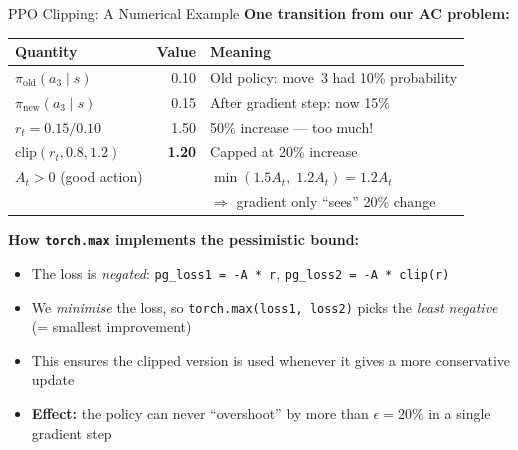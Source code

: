\documentclass[aspectratio=169,11pt]{beamer}
\begin{document}
\begin{frame}{PPO Clipping: A Numerical Example}
  \small
  \textbf{One transition from our AC problem:}
  \begin{center}
  \begin{tabular}{lrl}
    \toprule
    \textbf{Quantity} & \textbf{Value} & \textbf{Meaning} \\
    \midrule
    $\pi_\text{old}(a_3 \mid s)$ & 0.10 & Old policy: move~3 had 10\% probability \\
    $\pi_\text{new}(a_3 \mid s)$ & 0.15 & After gradient step: now 15\% \\
    $r_t = 0.15 / 0.10$ & 1.50 & 50\% increase --- too much! \\
    $\mathrm{clip}(r_t, 0.8, 1.2)$ & \textbf{1.20} & Capped at 20\% increase \\
    \midrule
    $A_t > 0$ (good action) & & $\min(1.5 A_t,\; 1.2 A_t) = 1.2 A_t$ \\
    & & $\Rightarrow$ gradient only ``sees'' 20\% change \\
    \bottomrule
  \end{tabular}
  \end{center}

  \medskip
  \textbf{How \texttt{torch.max} implements the pessimistic bound:}
  \begin{itemize}\setlength\itemsep{2pt}
    \item The loss is \emph{negated}: \texttt{pg\_loss1 = -A * r}, \texttt{pg\_loss2 = -A * clip(r)}
    \item We \emph{minimise} the loss, so \texttt{torch.max(loss1, loss2)} picks the
      \emph{least negative} (= smallest improvement)
    \item This ensures the clipped version is used whenever it gives a more conservative update
    \item \textbf{Effect:} the policy can never ``overshoot'' by more than $\epsilon = 20\%$
      in a single gradient step
  \end{itemize}
\end{frame}
\end{document}
